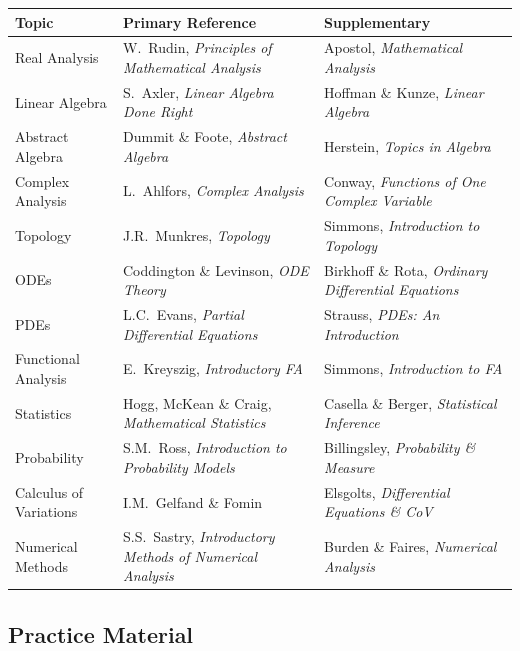 \documentclass[12pt,a4paper]{article}
\begin{document}
\begin{center}
\renewcommand{\arraystretch}{1.35}
\begin{tabular}{@{}p{3.5cm}p{5cm}p{5.5cm}@{}}
\toprule
\rowcolor{bluelight}
\textbf{Topic} & \textbf{Primary Reference} & \textbf{Supplementary} \\
\midrule
Real Analysis & W.\ Rudin, \textit{Principles of Mathematical Analysis} & Apostol, \textit{Mathematical Analysis} \\
Linear Algebra & S.\ Axler, \textit{Linear Algebra Done Right} & Hoffman \& Kunze, \textit{Linear Algebra} \\
Abstract Algebra & Dummit \& Foote, \textit{Abstract Algebra} & Herstein, \textit{Topics in Algebra} \\
Complex Analysis & L.\ Ahlfors, \textit{Complex Analysis} & Conway, \textit{Functions of One Complex Variable} \\
Topology & J.R.\ Munkres, \textit{Topology} & Simmons, \textit{Introduction to Topology} \\
ODEs & Coddington \& Levinson, \textit{ODE Theory} & Birkhoff \& Rota, \textit{Ordinary Differential Equations} \\
PDEs & L.C.\ Evans, \textit{Partial Differential Equations} & Strauss, \textit{PDEs: An Introduction} \\
Functional Analysis & E.\ Kreyszig, \textit{Introductory FA} & Simmons, \textit{Introduction to FA} \\
Statistics & Hogg, McKean \& Craig, \textit{Mathematical Statistics} & Casella \& Berger, \textit{Statistical Inference} \\
Probability & S.M.\ Ross, \textit{Introduction to Probability Models} & Billingsley, \textit{Probability \& Measure} \\
Calculus of Variations & I.M.\ Gelfand \& Fomin & Elsgolts, \textit{Differential Equations \& CoV} \\
Numerical Methods & S.S.\ Sastry, \textit{Introductory Methods of Numerical Analysis} & Burden \& Faires, \textit{Numerical Analysis} \\
\bottomrule
\end{tabular}
\end{center}

\subsection{Practice Material}
\end{document}
